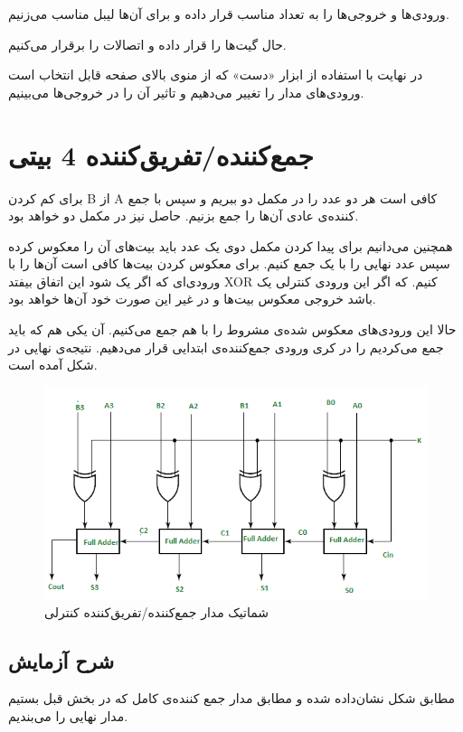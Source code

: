ورودی‌ها و خروجی‌ها را به تعداد مناسب قرار داده و برای آن‌ها لیبل مناسب می‌زنیم.

حال گیت‌ها را قرار داده و اتصالات را برقرار می‌کنیم.

در نهایت با استفاده از ابزار
«دست»
که از منوی بالای صفحه قابل انتخاب است ورودی‌های مدار را تغییر می‌دهیم و تاثیر آن را در خروجی‌ها می‌بینیم.


\section{
جمع‌کننده/تفریق‌کننده
4 بیتی
}
برای کم کردن
B
از
A
کافی است هر دو عدد را در مکمل دو ببریم و سپس با جمع کننده‌ی عادی آن‌ها را جمع بزنیم.
حاصل نیز در مکمل دو خواهد بود.

همچنین می‌دانیم برای پیدا کردن مکمل دوی یک عدد باید بیت‌های آن را معکوس کرده سپس عدد نهایی را با یک جمع کنیم.
برای معکوس کردن بیت‌ها کافی است آن‌ها را با ورودی‌ای که اگر یک شود این اتفاق بیفتد
XOR کنیم.
که اگر این ورودی کنترلی یک باشد خروجی معکوس بیت‌ها و در غیر این صورت خود آن‌ها خواهد بود.

حالا این ورودی‌های معکوس شده‌ی مشروط را با هم جمع می‌کنیم. آن یکی هم که باید جمع می‌کردیم را در کری ورودی جمع‌کننده‌ی ابتدایی قرار می‌دهیم. نتیجه‌ی نهایی در شکل آمده است.

\begin{figure}[h]
\centering
\includegraphics[scale=1]{Experimental Methods/2.png}
\caption{
شماتیک مدار جمع‌کننده/تفریق‌کننده کنترلی
}
\end{figure}

\subsection*{شرح آزمایش}
مطابق شکل نشان‌داده شده و مطابق مدار جمع کننده‌ی کامل که در بخش قبل بستیم مدار نهایی را می‌بندیم.

